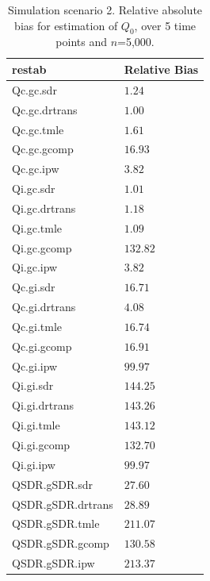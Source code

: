 \documentclass{article}\usepackage[]{graphicx}\usepackage[]{color}
\begin{document}
\begin{table}[H]
{\tiny
\begin{center}
\begin{tabular}{ll}
\toprule
\multicolumn{1}{l}{restab}&\multicolumn{1}{c}{Relative Bias}\tabularnewline
\midrule
Qc.gc.sdr&$  1.24$\tabularnewline
Qc.gc.drtrans&$  1.00$\tabularnewline
Qc.gc.tmle&$  1.61$\tabularnewline
Qc.gc.gcomp&$ 16.93$\tabularnewline
Qc.gc.ipw&$  3.82$\tabularnewline
Qi.gc.sdr&$  1.01$\tabularnewline
Qi.gc.drtrans&$  1.18$\tabularnewline
Qi.gc.tmle&$  1.09$\tabularnewline
Qi.gc.gcomp&$132.82$\tabularnewline
Qi.gc.ipw&$  3.82$\tabularnewline
Qc.gi.sdr&$ 16.71$\tabularnewline
Qc.gi.drtrans&$  4.08$\tabularnewline
Qc.gi.tmle&$ 16.74$\tabularnewline
Qc.gi.gcomp&$ 16.91$\tabularnewline
Qc.gi.ipw&$ 99.97$\tabularnewline
Qi.gi.sdr&$144.25$\tabularnewline
Qi.gi.drtrans&$143.26$\tabularnewline
Qi.gi.tmle&$143.12$\tabularnewline
Qi.gi.gcomp&$132.70$\tabularnewline
Qi.gi.ipw&$ 99.97$\tabularnewline
QSDR.gSDR.sdr&$ 27.60$\tabularnewline
QSDR.gSDR.drtrans&$ 28.89$\tabularnewline
QSDR.gSDR.tmle&$211.07$\tabularnewline
QSDR.gSDR.gcomp&$130.58$\tabularnewline
QSDR.gSDR.ipw&$213.37$\tabularnewline
\bottomrule
\end{tabular}

\caption{Simulation scenario 2. Relative absolute bias for estimation of $Q_0$, over 5 time points and $n$=5,000.\label{tab1}}\end{center}}

\end{table}
\end{document}

